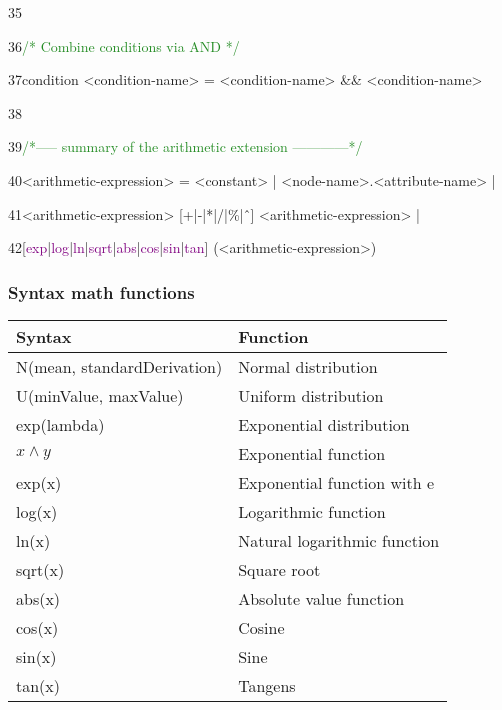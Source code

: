 {35

36\hspace{0.5cm}\textcolor{ForestGreen}{/* Combine conditions via AND */}

37\hspace{0.5cm}condition <condition-name> = <condition-name> \&\& <condition-name>

38

39\hspace{0.5cm}\textcolor{ForestGreen}{/*----- summary of the arithmetic extension ------------*/}

40\hspace{0.5cm}<arithmetic-expression> = <constant> | <node-name>.<attribute-name> |

41\hspace{0.5cm}<arithmetic-expression> [+|-|*|/|\%|ˆ] <arithmetic-expression> |

42\hspace{0.5cm}[\textcolor{Purple}{exp}|\textcolor{Purple}{log}|\textcolor{Purple}{ln}|\textcolor{Purple}{sqrt}|\textcolor{Purple}{abs}|\textcolor{Purple}{cos}|\textcolor{Purple}{sin}|\textcolor{Purple}{tan}] (<arithmetic-expression>)

}

\clearpage

\subsubsection{Syntax math functions}

{
\begin{center}
\begin{tabular}{ | m{4cm} | m{4cm} |  }
\hline
\textbf{Syntax} & \textbf{Function} \\
\hline
N(mean, standardDerivation) & Normal distribution  \\
\hline
U(minValue, maxValue) & Uniform distribution  \\
\hline
exp(lambda) & Exponential distribution \\
\hline
$x \wedge y$ & Exponential function \\
\hline
exp(x) & Exponential function with e \\
\hline
log(x) & Logarithmic function \\
\hline
ln(x) & Natural logarithmic function \\
\hline
sqrt(x) & Square root \\
\hline
abs(x) & Absolute value function \\
\hline
cos(x) & Cosine \\
\hline
sin(x) & Sine \\
\hline
tan(x) & Tangens \\
\hline

\end{tabular}
\end{center}
}

\clearpage
